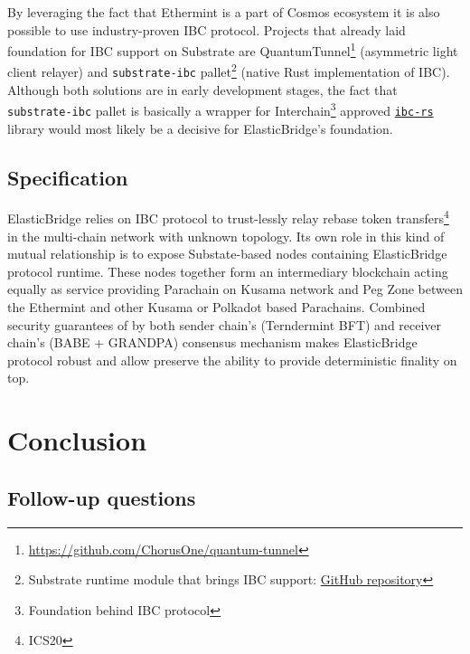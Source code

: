\documentclass{article}
\begin{document}
By leveraging the fact that Ethermint is a part of Cosmos ecosystem it is also possible to use industry-proven IBC protocol. Projects that already laid foundation for IBC support on Substrate are QuantumTunnel\footnote{\url{https://github.com/ChorusOne/quantum-tunnel}} (asymmetric light client relayer) and \texttt{substrate-ibc} pallet\footnote{Substrate runtime module that brings IBC support: \href{https://github.com/octopus-network/substrate-ibc}{GitHub repository}} (native Rust implementation of IBC). Although both solutions are in early development stages, the fact that \texttt{substrate-ibc} pallet is basically a wrapper for Interchain\footnote{Foundation behind IBC protocol} approved \texttt{\href{https://github.com/informalsystems/ibc-rs}{ibc-rs}} library would most likely be a decisive for ElasticBridge's foundation.

\subsection{Specification}

ElasticBridge relies on IBC protocol to trust-lessly relay rebase token transfers\footnote{ICS20} in the multi-chain network with unknown topology. Its own role in this kind of mutual relationship is to expose Substate-based nodes containing ElasticBridge protocol runtime. These nodes together form an intermediary blockchain acting equally as service providing Parachain on Kusama network and Peg Zone between the Ethermint and other Kusama or Polkadot based Parachains. Combined security guarantees of by both sender chain's (Terndermint BFT) and receiver chain's (BABE + GRANDPA) consensus mechanism makes ElasticBridge protocol robust and allow preserve the ability to provide deterministic finality on top.



\section{Conclusion}

\subsection{Follow-up questions}



\end{document}
